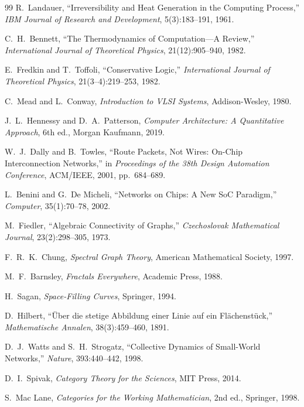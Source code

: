 \documentclass[11pt, a4paper]{article}
\begin{document}
\begin{thebibliography}{99}
R.\ Landauer, ``Irreversibility and Heat Generation in the Computing Process,''
\textit{IBM Journal of Research and Development}, 5(3):183--191, 1961.

C.\ H.\ Bennett, ``The Thermodynamics of Computation---A Review,''
\textit{International Journal of Theoretical Physics}, 21(12):905--940, 1982.

E.\ Fredkin and T.\ Toffoli, ``Conservative Logic,''
\textit{International Journal of Theoretical Physics}, 21(3--4):219--253, 1982.

C.\ Mead and L.\ Conway, \textit{Introduction to VLSI Systems},
Addison-Wesley, 1980.

J.\ L.\ Hennessy and D.\ A.\ Patterson, \textit{Computer Architecture: A Quantitative
Approach}, 6th ed., Morgan Kaufmann, 2019.

W.\ J.\ Dally and B.\ Towles, ``Route Packets, Not Wires: On-Chip Interconnection
Networks,'' in \textit{Proceedings of the 38th Design Automation Conference},
ACM/IEEE, 2001, pp.\ 684--689.

L.\ Benini and G.\ De Micheli, ``Networks on Chips: A New SoC Paradigm,''
\textit{Computer}, 35(1):70--78, 2002.

M.\ Fiedler, ``Algebraic Connectivity of Graphs,''
\textit{Czechoslovak Mathematical Journal}, 23(2):298--305, 1973.

F.\ R.\ K.\ Chung, \textit{Spectral Graph Theory},
American Mathematical Society, 1997.

M.\ F.\ Barnsley, \textit{Fractals Everywhere}, Academic Press, 1988.

H.\ Sagan, \textit{Space-Filling Curves}, Springer, 1994.

D.\ Hilbert, ``{\"U}ber die stetige Abbildung einer Linie auf ein
Fl{\"a}chenst{\"u}ck,'' \textit{Mathematische Annalen}, 38(3):459--460, 1891.

D.\ J.\ Watts and S.\ H.\ Strogatz, ``Collective Dynamics of Small-World Networks,''
\textit{Nature}, 393:440--442, 1998.

D.\ I.\ Spivak, \textit{Category Theory for the Sciences}, MIT Press, 2014.

S.\ Mac Lane, \textit{Categories for the Working Mathematician},
2nd ed., Springer, 1998.


\end{thebibliography}
\end{document}
